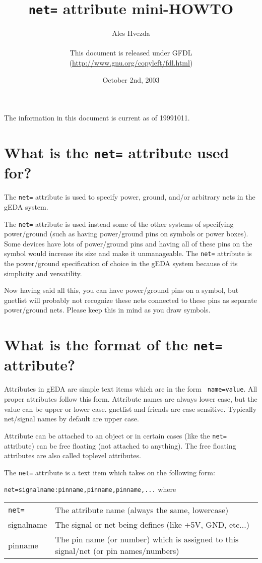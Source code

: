 \documentclass{article}
\title{{\tt net=} attribute mini-HOWTO}
\author{Ales Hvezda\\
        \\
        This document is released under GFDL\\ 
        (\url{http://www.gnu.org/copyleft/fdl.html})}
\date{October 2nd, 2003}
\begin{document}
\maketitle
\newpage

\tableofcontents
\newpage

The information in this document is current as of 19991011.

\section{What is the {\tt net=} attribute used for?}
The {\tt net=} attribute is used to specify power, ground, and/or arbitrary
nets in the gEDA system.

The {\tt net=} attribute is used instead some of the other systems of
specifying power/ground (such as having power/ground pins on symbols
or power boxes).  Some devices have lots of power/ground pins and
having all of these pins on the symbol would increase its size and
make it unmanageable.  The {\tt net=} attribute is the power/ground
specification of choice in the gEDA system because of its simplicity
and versatility.

Now having said all this, you can have power/ground pins on a symbol,
but gnetlist will probably not recognize these nets connected to these
pins as separate power/ground nets.  Please keep this in mind as you
draw symbols.



\section{What is the format of the {\tt net=} attribute?}
Attributes in gEDA are simple text items which are in the form {\tt
name=value}.  All proper attributes follow this form.  Attribute names
are always lower case, but the value can be upper or lower case.
gnetlist and friends are case sensitive.  Typically net/signal names
by default are upper case.

Attribute can be attached to an object or in certain cases (like the
{\tt net=} attribute) can be free floating (not attached to anything).  The
free floating attributes are also called toplevel attributes.

The {\tt net=} attribute is a text item which takes on the following
form:

{\tt net=signalname:pinname,pinname,pinname,...} 
where
\\
\begin{tabular}{l p{4in}}
  {\tt net=}  &	The attribute name (always the same, lowercase) \\
  signalname  & The signal or net being defines (like +5V, GND,
  etc...) \\
  pinname     &	The pin name (or number) which is assigned to this
			signal/net (or pin names/numbers) \\
\end{tabular}
\end{document}
